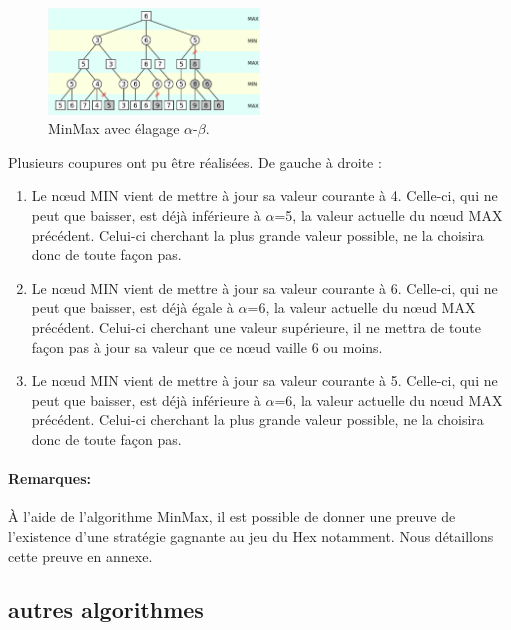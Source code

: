 \begin{figure}[h]
    \begin{center}
        \includegraphics[width=0.5\textwidth]{root/minmax_alpha_beta.png}
    \end{center}
    \caption{MinMax avec élagage $\alpha$-$\beta$.}\label{fig:min_max_alpha_beta}
\end{figure}


Plusieurs coupures ont pu être réalisées. De gauche à droite :
\begin{enumerate}
    \item Le nœud MIN vient de mettre à jour sa valeur courante à 4. Celle-ci, qui ne peut que baisser, est déjà inférieure à $\alpha$=5, 
    la valeur actuelle du nœud MAX précédent. Celui-ci cherchant la plus grande valeur possible, ne la choisira donc de toute façon pas.
    \item Le nœud MIN vient de mettre à jour sa valeur courante à 6. Celle-ci, qui ne peut que baisser, est déjà égale à $\alpha$=6, la valeur 
    actuelle du nœud MAX précédent. Celui-ci cherchant une valeur supérieure, il ne mettra de toute façon pas à jour sa valeur que ce nœud 
    vaille 6 ou moins.
    \item Le nœud MIN vient de mettre à jour sa valeur courante à 5. Celle-ci, qui ne peut que baisser, est déjà inférieure à $\alpha$=6, la valeur 
    actuelle du nœud MAX précédent. Celui-ci cherchant la plus grande valeur possible, ne la choisira donc de toute façon pas.
\end{enumerate}

\paragraph{Remarques:}
À l'aide de l'algorithme MinMax, il est possible de donner une preuve de l'existence d'une stratégie gagnante au jeu du Hex notamment. Nous détaillons
cette preuve en annexe.

\subsection{autres algorithmes}
